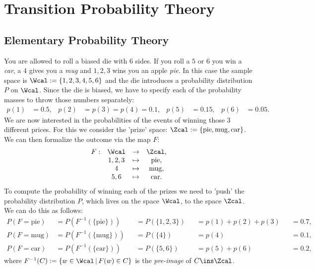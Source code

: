 \section{Transition Probability Theory}
 

\subsection{Elementary Probability Theory}

\begin{Eg}%
    \label{example-die}
    You are allowed to roll a biased die with 6 sides. If you roll a $5$ or $6$ you win a \emph{car}, a $4$ 
    gives you a \emph{mug} 
    and $1,2,3$ wins you an apple \emph{pie}. 
    In this case the sample space is $\Wcal :=\{1,2,3,4,5,6\}$ and the die introduces a probability distribution $P$ on $\Wcal$.
    Since the die is biased, we have to specify 
    each of the probability masses to throw those numbers separately: 
    \begin{align*}
        p(1) & = 0.5, &
        p(2) & = p(3) = p(4) = 0.1, &
        p(5) & = 0.15 , & 
        p(6) & = 0.05.
    \end{align*}
    We are now interested in the probabilities of the events of winning those 3 different prices. 
    For this we consider the 'prize' space: $\Zcal :=\{\mathrm{pie}, \mathrm{mug}, \mathrm{car}\}$. 
    We can then formalize the outcome via the map $F$:
    \[\begin{array}{cccc}
        F: & \Wcal &\to& \Zcal,\\
           &1,2,3 &\mapsto& \mathrm{pie},\\
        & 4 & \mapsto& \mathrm{mug},\\
        & 5,6 & \mapsto& \mathrm{car}.
    \end{array}\]
    To compute the probability of winning each of the prizes we need to 'push' the probability distribution $P$, which lives on the space $\Wcal$, to the space $\Zcal$. We can do this as follows:
    \begin{align*}
        P(F=\mathrm{pie}) &= P(F^{-1}(\{\mathrm{pie}\})) && = P(\{1,2,3\}) && = p(1)+p(2)+p(3) && = 0.7,\\
            P(F=\mathrm{mug}) &= P(F^{-1}(\{\mathrm{mug}\})) && = P(\{4\}) && = p(4) && = 0.1,\\
            P(F=\mathrm{car}) &= P(F^{-1}(\{\mathrm{car}\})) && = P(\{5,6\}) && = p(5)+p(6) && = 0.2,
    \end{align*}
    where $F^{-1}(C) := \{w \in \Wcal\,|\,F(w) \in C\}$ is the \emph{pre-image} of $C \ins \Zcal$.
\end{Eg}

